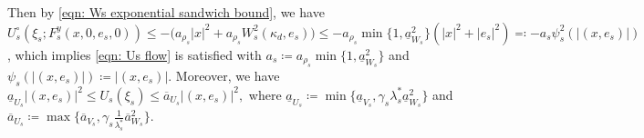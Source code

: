 Then by \eqref{eqn: Ws exponential sandwich bound}, we have
$
U_s^\circ(\xi_s; F_s^y(x,0,e_s, 0)) \leq  - \big(a_{\rho_s} |x|^2 + a_{\rho_s} W_s^2(\kappa_d,e_s)\big) \leq  - a_{\rho_s} \min \{ 1, \underline{a}_{W_s}^2 \} (|x|^2+|e_s|^2) \eqqcolon  - a_s \psi_s^2(|(x,e_s)|)
$,
which implies \eqref{eqn: Us flow} is satisfied with $a_s \coloneqq a_{\rho_s} \min \{ 1, \underline{a}_{W_s}^2 \}$ and $\psi_s(|(x,e_s)|) \coloneqq |(x,e_s)|$. 
%
Moreover, we have $\underline{a}_{U_s}|(x,e_s)|^2 \leq U_s(\xi_s) \leq \overline{a}_{U_s}|(x,e_s)|^2,$ where $\underline{a}_{U_s} \coloneqq \min\{\underline{a}_{V_s}, \gamma_s \lambda_s^* \underline{a}_{W_s}^2 \}$ and $\overline{a}_{U_s} \coloneqq \max\{\overline{a}_{V_s}, \gamma_s \tfrac{1}{\lambda_s^*} \overline{a}_{W_s}^2 \}$.

